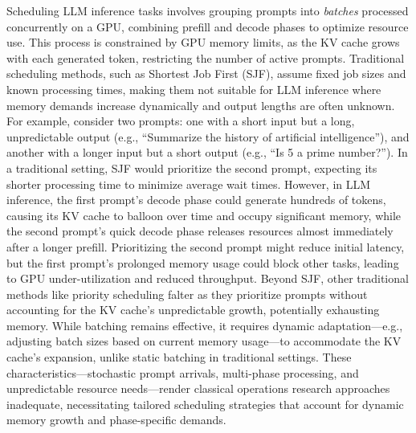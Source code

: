 Scheduling LLM inference tasks involves grouping prompts into \textit{batches} processed concurrently on a GPU, combining prefill and decode phases to optimize resource use. This process is constrained by GPU memory limits, as the KV cache grows with each generated token, restricting the number of active prompts. Traditional scheduling methods, such as Shortest Job First (SJF), assume fixed job sizes and known processing times, making them not suitable for LLM inference where memory demands increase dynamically and output lengths are often unknown. For example, consider two prompts: one with a short input but a long, unpredictable output (e.g., ``Summarize the history of artificial intelligence''), and another with a longer input but a short output (e.g., ``Is 5 a prime number?''). In a traditional setting, SJF would prioritize the second prompt, expecting its shorter processing time to minimize average wait times. However, in LLM inference, the first prompt’s decode phase could generate hundreds of tokens, causing its KV cache to balloon over time and occupy significant memory, while the second prompt’s quick decode phase releases resources almost immediately after a longer prefill. Prioritizing the second prompt might reduce initial latency, but the first prompt’s prolonged memory usage could block other tasks, leading to GPU under-utilization and reduced throughput. Beyond SJF, other traditional methods like priority scheduling falter as they prioritize prompts without accounting for the KV cache’s unpredictable growth, potentially exhausting memory. While batching remains effective, it requires dynamic adaptation—e.g., adjusting batch sizes based on current memory usage—to accommodate the KV cache’s expansion, unlike static batching in traditional settings. These characteristics—stochastic prompt arrivals, multi-phase processing, and unpredictable resource needs—render classical operations research approaches inadequate, necessitating tailored scheduling strategies that account for dynamic memory growth and phase-specific demands.

